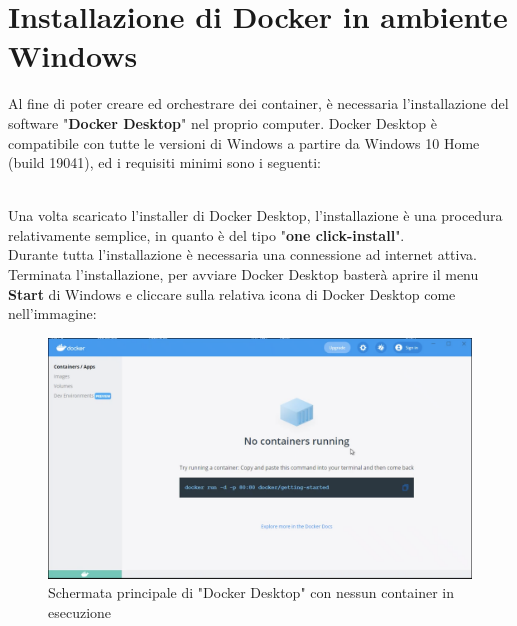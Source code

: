 \section{Installazione di Docker in ambiente Windows}
Al fine di poter creare ed orchestrare dei container, è necessaria l'installazione del software "\textbf{Docker Desktop}" nel proprio computer. Docker Desktop è compatibile con tutte le versioni di Windows a partire da Windows 10 Home (build 19041), ed i requisiti minimi sono i seguenti:
\\
Una volta scaricato l'\gls{installer} di Docker Desktop, l'installazione è una procedura relativamente semplice, in quanto è del tipo "\textbf{one click-install}". \\
Durante tutta l'installazione è necessaria una connessione ad internet attiva.\\
Terminata l'installazione, per avviare Docker Desktop basterà aprire il menu \textbf{Start} di Windows e cliccare sulla relativa icona di Docker Desktop come nell'immagine:\\
\begin{figure}[!h]     
\centering 
    \includegraphics[width=1.0\columnwidth]{immagini/screenshot/docker_desktop_initialscreen} 
    \caption{Schermata principale di "Docker Desktop" con nessun container in esecuzione}
\end{figure} \\


